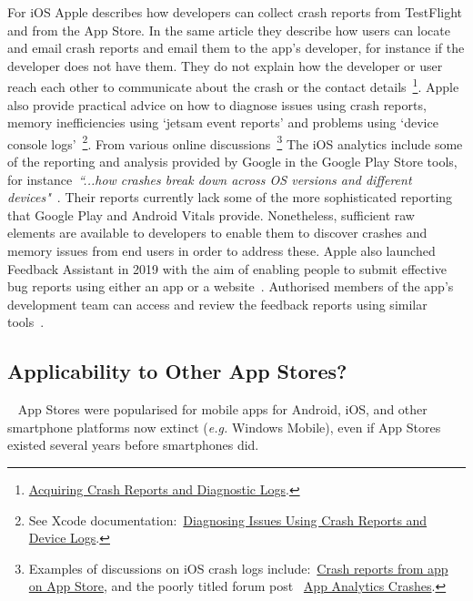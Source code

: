For iOS Apple describes how developers can collect crash reports from TestFlight and from the App Store. In the same article they describe how users can locate and email crash reports and email them to the app's developer, for instance if the developer does not have them. They do not explain how the developer or user reach each other to communicate about the crash or the contact details~\footnote{\href{https://developer.apple.com/documentation/xcode/diagnosing_issues_using_crash_reports_and_device_logs/acquiring_crash_reports_and_diagnostic_logs}{Acquiring Crash Reports and Diagnostic Logs}.}. 
%
Apple also provide practical advice on how to diagnose issues using crash reports, memory inefficiencies using `jetsam event reports' and problems using `device console logs'~\footnote{See Xcode documentation:~\href{https://developer.apple.com/documentation/xcode/diagnosing_issues_using_crash_reports_and_device_logs}{Diagnosing Issues Using Crash Reports and Device Logs}.}. 
% 
From various online discussions~\footnote{Examples of discussions on iOS crash logs include:~\href{https://stackoverflow.com/questions/10145665/crash-reports-from-app-on-app-store}{Crash reports from app on App Store}, and the poorly titled forum post ~\href{https://developer.apple.com/forums/thread/30934}{App Analytics Crashes}.} 
The iOS analytics include some of the reporting and analysis provided by Google in the Google Play Store tools, for instance~\emph{``...how crashes break down across OS versions and different devices"}~. Their reports currently lack some of the more sophisticated reporting that Google Play and Android Vitals provide. Nonetheless, sufficient raw elements are available to developers to enable them to discover crashes and memory issues from end users in order to address these. Apple also launched Feedback Assistant in 2019 with the aim of enabling people to submit effective bug reports using either an app or a website~. Authorised members of the app's development team can access and review the feedback reports using similar tools~.


\subsection{Applicability to Other App Stores?}~
App Stores were popularised for mobile apps for Android, iOS, and other smartphone platforms now extinct (\emph{e.g.} Windows Mobile), even if App Stores existed several years before smartphones did. %

